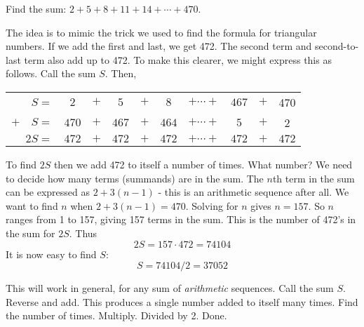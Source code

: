 \documentclass[12pt]{article}
\begin{document}
\begin{example}
  Find the sum:  $2 + 5 + 8 + 11 + 14 + \cdots + 470$.
  
  \begin{solution}
    The idea is to mimic the trick we used to find the formula for triangular numbers.  If we add the first and last, we get 472.  The second term and second-to-last term also add up to 472.  To make this clearer, we might express this as follows.  Call the sum $S$.  Then,
    
    \begin{center}
    \begin{tabular}{rccccccccc}
      $S  =  $& $2 $&$ + $& $5$ & $ + $ & $8$ & $+ \cdots + $ & $467$ &$ + $ & 470 \\
     $+ \quad S  = $& $470$ & $+ $ & $467$ & $ + $ & $464$& $+ \cdots + $&$ 5$ & $+$ & 2 \\ \hline
     $2S  = $& $472$ & $+ $ & $472$ & $ + $ & $472$& $+ \cdots + $&$472$ & $+$ & $472$ \\
    \end{tabular}
    \end{center}
    
    To find $2S$ then we add 472 to itself a number of times.  What number?  We need to decide how many terms (summands) are in the sum.  The $n$th term in the sum can be expressed as $2 + 3(n-1)$ - this is an arithmetic sequence after all.  We want to find $n$ when $2 + 3(n-1) = 470$.  Solving for $n$ gives $n = 157$.  So $n$ ranges from 1 to 157, giving 157 terms in the sum.  This is the number of 472's in the sum for $2S$.  Thus
    \[2S = 157\cdot 472 = 74104\]
    It is now easy to find $S$:
    \[S = 74104/2 = 37052\]
  \end{solution}
\end{example}

This will work in general, for any sum of {\em arithmetic} sequences.  Call the sum $S$.  Reverse and add.  This produces a single number added to itself many times.  Find the number of times.  Multiply.  Divided by 2.  Done.
\end{document}
